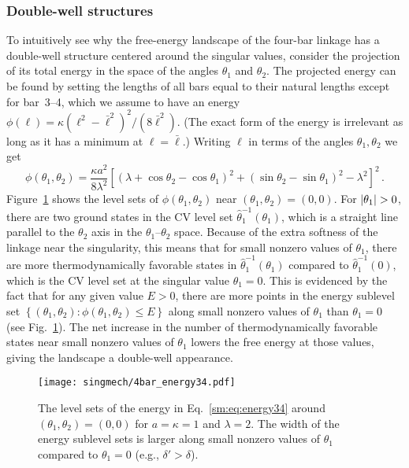 \subsubsection{Double-well structures}

To intuitively see why the free-energy landscape of the four-bar linkage has a double-well structure centered around the singular values, consider the projection of its total energy in the space of the angles $\theta_{1}$ and $\theta_{2}$.
The projected energy can be found by setting the lengths of all bars equal to their natural lengths except for bar~3--4, which we assume to have an energy $\phi(\ell) = \kappa(\ell^{2} - \bar{\ell}^{2})^{2}/(8\bar{\ell}^{2})$.
(The exact form of the energy is irrelevant as long as it has a minimum at $\ell = \bar{\ell}$.)
Writing $\ell$ in terms of the angles $\theta_{1}, \theta_{2}$ we get
%
\begin{equation}
  \phi(\theta_{1}, \theta_{2}) = \frac{\kappa a^{2}}{8\lambda^{2}}\left[(\lambda + \cos\theta_{2} - \cos\theta_{1})^{2} + (\sin\theta_{2} - \sin\theta_{1})^{2} - \lambda^{2}\right]^{2}\,.
  \label{sm:eq:energy34}
\end{equation}
%
Figure~\ref{sm:fig:energy34} shows the level sets of $\phi(\theta_{1}, \theta_{2})$ near $(\theta_{1}, \theta_{2}) = (0, 0)$.
For $\lvert\theta_{1}\rvert > 0$, there are two ground states in the CV level set $\hat{\theta}_{1}^{-1}(\theta_{1})$, which is a straight line parallel to the $\theta_{2}$ axis in the $\theta_{1}$--$\theta_{2}$ space.
Because of the extra softness of the linkage near the singularity, this means that for small nonzero values of $\theta_{1}$, there are more thermodynamically favorable states in $\hat{\theta}_{1}^{-1}(\theta_{1})$ compared to $\hat{\theta}_{1}^{-1}(0)$, which is the CV level set at the singular value $\theta_{1}=0$.
This is evidenced by the fact that for any given value $E > 0$, there are more points in the energy sublevel set $\left\{(\theta_{1}, \theta_{2}): \phi(\theta_{1}, \theta_{2}) \leq E\right\}$ along small nonzero values of $\theta_{1}$ than $\theta_{1} = 0$ (see Fig.~\ref{sm:fig:energy34}).
The net increase in the number of thermodynamically favorable states near small nonzero values of $\theta_{1}$ lowers the free energy at those values, giving the landscape a double-well appearance.
%
\begin{figure}
  \begin{center}
    \texttt{[image: singmech/4bar\_energy34.pdf]}
  \end{center}
  \caption{The level sets of the energy in Eq.~\eqref{sm:eq:energy34} around $(\theta_{1}, \theta_{2}) = (0, 0)$ for $a = \kappa = 1$ and $\lambda = 2$.  The width of the energy sublevel sets is larger along small nonzero values of $\theta_{1}$ compared to $\theta_{1} = 0$ (e.g., $\delta' > \delta$).}
  \label{sm:fig:energy34}
\end{figure}

